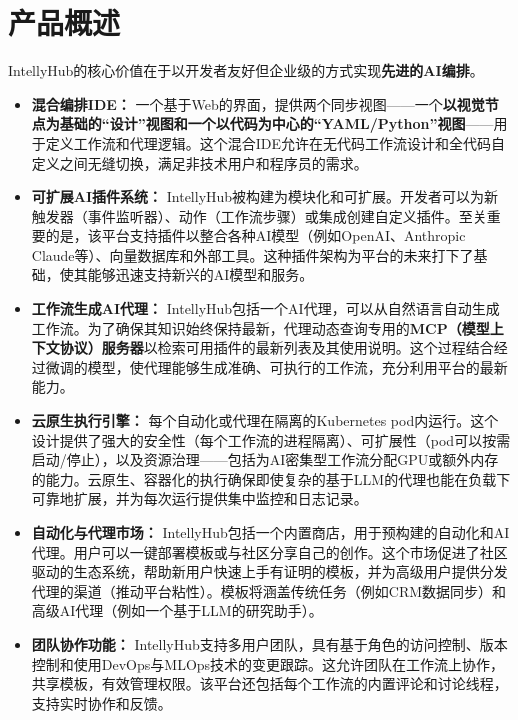 \documentclass[11pt, a4paper, oneside]{article}
\begin{document}
\section{产品概述}
IntellyHub的核心价值在于以开发者友好但企业级的方式实现\textbf{先进的AI编排}。
\begin{itemize}
    \item \textbf{混合编排IDE：} 一个基于Web的界面，提供两个同步视图——一个\textbf{以视觉节点为基础的“设计”视图和一个以代码为中心的“YAML/Python”视图}——用于定义工作流和代理逻辑。这个混合IDE允许在无代码工作流设计和全代码自定义之间无缝切换，满足非技术用户和程序员的需求。
    
    \item \textbf{可扩展AI插件系统：} IntellyHub被构建为模块化和可扩展。开发者可以为新触发器（事件监听器）、动作（工作流步骤）或集成创建自定义插件。至关重要的是，该平台支持插件以整合各种AI模型（例如OpenAI、Anthropic Claude等）、向量数据库和外部工具。这种插件架构为平台的未来打下了基础，使其能够迅速支持新兴的AI模型和服务。
    
    \item \textbf{工作流生成AI代理：} IntellyHub包括一个AI代理，可以从自然语言自动生成工作流。为了确保其知识始终保持最新，代理动态查询专用的\textbf{MCP（模型上下文协议）服务器}以检索可用插件的最新列表及其使用说明。这个过程结合经过微调的模型，使代理能够生成准确、可执行的工作流，充分利用平台的最新能力。
    
    \item \textbf{云原生执行引擎：} 每个自动化或代理在隔离的Kubernetes pod内运行。这个设计提供了强大的安全性（每个工作流的进程隔离）、可扩展性（pod可以按需启动/停止），以及资源治理——包括为AI密集型工作流分配GPU或额外内存的能力。云原生、容器化的执行确保即使复杂的基于LLM的代理也能在负载下可靠地扩展，并为每次运行提供集中监控和日志记录。
    
    \item \textbf{自动化与代理市场：} IntellyHub包括一个内置商店，用于预构建的自动化和AI代理。用户可以一键部署模板或与社区分享自己的创作。这个市场促进了社区驱动的生态系统，帮助新用户快速上手有证明的模板，并为高级用户提供分发代理的渠道（推动平台粘性）。模板将涵盖传统任务（例如CRM数据同步）和高级AI代理（例如一个基于LLM的研究助手）。
    
    \item \textbf{团队协作功能：} IntellyHub支持多用户团队，具有基于角色的访问控制、版本控制和使用DevOps与MLOps技术的变更跟踪。这允许团队在工作流上协作，共享模板，有效管理权限。该平台还包括每个工作流的内置评论和讨论线程，支持实时协作和反馈。
\end{itemize}
\end{document}
